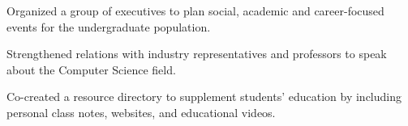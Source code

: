 \begin{cventries}
{\begin{cvitems}
        \item {Organized a group of executives to plan social, academic and career-focused events for the undergraduate population.}
        \item {Strengthened relations with industry representatives and professors to speak about the Computer Science field.}
        \item {Co-created a resource directory to supplement students' education by including personal class notes, websites, and educational videos.}
      \end{cvitems}
    }
\end{cventries}
